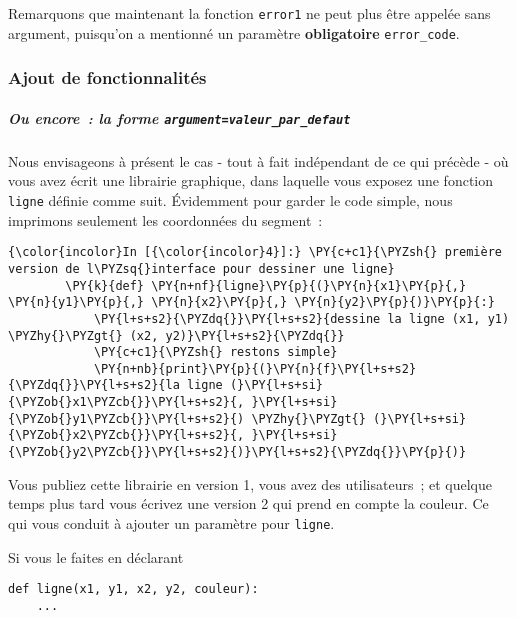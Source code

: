    Remarquons que maintenant la fonction \texttt{error1} ne peut plus être
appelée sans argument, puisqu'on a mentionné un paramètre
\textbf{obligatoire} \texttt{error\_code}.

    \hypertarget{ajout-de-fonctionnalituxe9s}{%
\subsubsection{Ajout de
fonctionnalités}\label{ajout-de-fonctionnalituxe9s}}

    \hypertarget{ou-encore-la-forme-argumentvaleur_par_defaut}{%
\subparagraph{\texorpdfstring{Ou encore~: la forme
\texttt{argument=valeur\_par\_defaut}}{Ou encore~: la forme argument=valeur\_par\_defaut}}\label{ou-encore-la-forme-argumentvaleur_par_defaut}}

    Nous envisageons à présent le cas - tout à fait indépendant de ce qui
précède - où vous avez écrit une librairie graphique, dans laquelle vous
exposez une fonction \texttt{ligne} définie comme suit. Évidemment pour
garder le code simple, nous imprimons seulement les coordonnées du
segment~:

    \begin{Verbatim}[commandchars=\\\{\}]
{\color{incolor}In [{\color{incolor}4}]:} \PY{c+c1}{\PYZsh{} première version de l\PYZsq{}interface pour dessiner une ligne}
        \PY{k}{def} \PY{n+nf}{ligne}\PY{p}{(}\PY{n}{x1}\PY{p}{,} \PY{n}{y1}\PY{p}{,} \PY{n}{x2}\PY{p}{,} \PY{n}{y2}\PY{p}{)}\PY{p}{:}
            \PY{l+s+s2}{\PYZdq{}}\PY{l+s+s2}{dessine la ligne (x1, y1) \PYZhy{}\PYZgt{} (x2, y2)}\PY{l+s+s2}{\PYZdq{}}
            \PY{c+c1}{\PYZsh{} restons simple}
            \PY{n+nb}{print}\PY{p}{(}\PY{n}{f}\PY{l+s+s2}{\PYZdq{}}\PY{l+s+s2}{la ligne (}\PY{l+s+si}{\PYZob{}x1\PYZcb{}}\PY{l+s+s2}{, }\PY{l+s+si}{\PYZob{}y1\PYZcb{}}\PY{l+s+s2}{) \PYZhy{}\PYZgt{} (}\PY{l+s+si}{\PYZob{}x2\PYZcb{}}\PY{l+s+s2}{, }\PY{l+s+si}{\PYZob{}y2\PYZcb{}}\PY{l+s+s2}{)}\PY{l+s+s2}{\PYZdq{}}\PY{p}{)}
\end{Verbatim}


    Vous publiez cette librairie en version 1, vous avez des utilisateurs~;
et quelque temps plus tard vous écrivez une version 2 qui prend en
compte la couleur. Ce qui vous conduit à ajouter un paramètre pour
\texttt{ligne}.

    Si vous le faites en déclarant

\begin{verbatim}
def ligne(x1, y1, x2, y2, couleur):
    ...
  
\end{verbatim}

